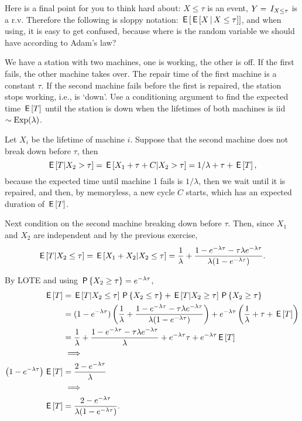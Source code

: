 \documentclass[lectures]{subfiles}
\begin{document}
\begin{exercise}
\begin{solution}
Here is a final point for you to think hard about: ${X\leq \tau}$ is an event, $Y=\1{X \leq \tau}$ is a r.v. Therefore the following is sloppy notation: $\E{\E{X\given X\leq \tau}}$, and when using, it is easy to get confused, because where is the random variable we should have according to Adam's law?
\end{solution}
\end{exercise}


\begin{exercise}
We have a station with two machines, one is working, the other is off.
If the first fails, the other machine takes over.
The repair time of the first machine is a constant $\tau$.
If the second machine fails before the first is repaired, the station stops working, i.e., is `down'.
Use a conditioning argument to find the expected time $\E T$ until the station is down when the lifetimes of both machines is iid $\sim\Exp{\lambda}$.
\begin{solution}
Let $X_i$ be the lifetime of machine $i$. Suppose that  the second machine does not break down before $\tau$, then
\begin{equation}
\E{T| X_{2}>\tau} = \E{X_{1} + \tau + C |X_2>\tau} = 1/\lambda + \tau + \E T,
\end{equation}
because the expected time until machine 1 fails is $1/\lambda$, then we wait until it is repaired, and then, by memoryless, a new cycle $C$ starts, which has an expected duration of $\E T$.

Next condition on the second machine breaking down before $\tau$. Then, since $X_{1}$ and $X_2$ are independent and by the previous exercise,
\begin{equation}
\E{T| X_{2}\leq \tau} = \E{X_{1} + X_{2}  |X_2\leq \tau} = \frac{1}{\lambda} + \frac{ 1- e^{-\lambda \tau}- \tau \lambda  e^{-\lambda \tau}}{\lambda(1-e^{-\lambda \tau})}.
\end{equation}

By LOTE and using $\P{X_{2}\geq \tau} = e^{-\lambda \tau}$,
\begin{align}
  \label{eq:924}
\E T
&=
\E{T| X_{2}\leq \tau} \P{X_{2}\leq \tau} + \E{T| X_{2}\geq \tau} \P{X_{2}\geq \tau} \\
&=(1-e^{-\lambda \tau})\left( \frac 1\lambda+
\frac{ 1- e^{-\lambda \tau}- \tau \lambda  e^{-\lambda \tau}}{\lambda(1-e^{-\lambda \tau})} \right)
+e^{-\lambda \tau}\left( \frac{1}{\lambda} + \tau + \E T \right) \\
&=\frac{1}{\lambda} + \frac{ 1- e^{-\lambda \tau}- \tau \lambda  e^{-\lambda \tau}}{\lambda}
+e^{-\lambda \tau} \tau + e^{-\lambda \tau}\E T \\
&\implies \\
\left( 1-e^{-\lambda \tau} \right) \E T
&=\frac{2-e^{-\lambda \tau}}{\lambda} \\
&\implies \\
\E T
&=\frac{2-e^{-\lambda \tau}}{\lambda(1-e^{-\lambda \tau})}.
\end{align}


\end{solution}
\end{exercise}
\end{document}

